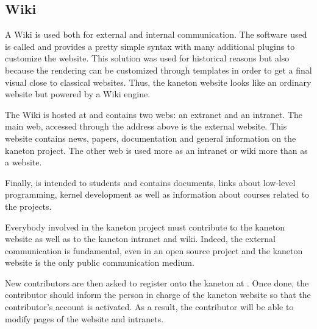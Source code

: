 %
%
%
%
%
%

%
%

\subsection{Wiki}
\label{section:wiki}

A Wiki is used both for external and internal communication. The software
used is called  and provides a pretty simple syntax with
many additional plugins to customize the website. This solution was used
for historical reasons but also because the  rendering can
be customized through templates in order to get a final visual close to
classical websites. Thus, the kaneton website looks like an ordinary
website but powered by a Wiki engine.

The Wiki is hosted at  and contains two
webs: an extranet and an intranet. The main web, accessed through the
address above is the external website. This website contains news, papers,
documentation and general information on the kaneton project. The other
web is used more as an intranet or wiki more than as a website.

Finally,  is intended to students and contains
documents, links \etc{} about low-level programming, kernel development \etc{}
as well as information about courses related to the  projects.

Everybody involved in the kaneton project must contribute to the kaneton
website as well as to the kaneton intranet and wiki. Indeed, the external
communication is fundamental, even in an open source project and the kaneton
website is the only public communication medium.

New contributors are then asked to register onto the kaneton 
at . Once done, the contributor should
inform the person in charge of the kaneton website so that  the contributor's
account is activated. As a result, the contributor will be able to modify
pages of the website and intranets.
